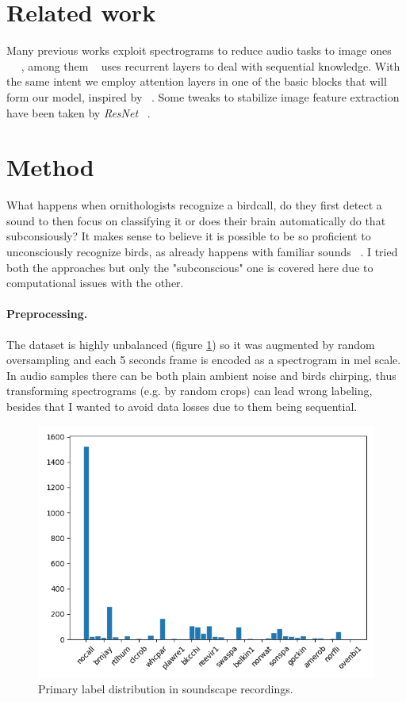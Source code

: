 \documentclass{article}
\begin{document}
\section{Related work}
Many previous works exploit spectrograms to reduce audio tasks to image ones ~\cite{hamdyaudio} ~\cite{michelashvili2020denoising} ~\cite{xie2021audio}, among them ~\cite{xie2021audio} uses recurrent layers to deal with sequential knowledge.
With the same intent we employ attention layers in one of the basic blocks that will form our model, inspired by ~\cite{zhang2020resnest}.
Some tweaks to stabilize image feature extraction have been taken by \textit{ResNet} ~\cite{he2016deep}.

\section{Method} \label{sec:method}
What happens when ornithologists recognize a birdcall, do they first detect a sound to then focus on classifying it or does their brain automatically do that subconsiously?
It makes sense to believe it is possible to be so proficient to unconsciously recognize birds, as already happens with familiar sounds ~\cite{kirmse2009familiarity}. 
I tried both the approaches but only the "subconscious" one is covered here due to computational issues with the other.

\paragraph*{Preprocessing.}
The dataset is highly unbalanced (figure \ref{fig:soundscapes_classification_freq}) 
so it was augmented by random oversampling and each 5 seconds frame is encoded as a spectrogram in mel scale.
In audio samples there can be both plain ambient noise and birds chirping, thus transforming spectrograms (e.g. by random crops) can lead wrong labeling, besides that I wanted to avoid data losses due to them being sequential.

\begin{figure}
    \centering
    \includegraphics[scale=.35]{images/soundscapes_distribution_birds.png}
    \caption{Primary label distribution in soundscape recordings.}
    \label{fig:soundscapes_classification_freq}
\end{figure}
\end{document}
